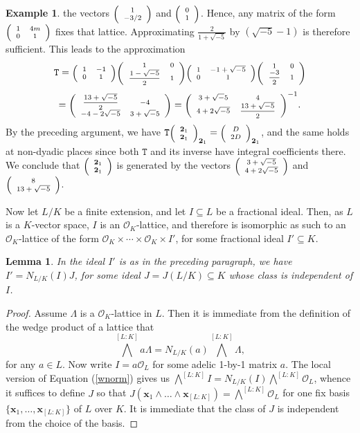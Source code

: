 \documentclass{article}
\newtheorem{Lem}[Prop]{Lemma}
\theoremstyle{definition}
\newtheorem{ex}[Prop]{Example}
\theoremstyle{remark}
\newcommand\sbmattrix[4]{\textnormal{\scriptsize$\left(\begin{array}{cc}#1&#2\\#3&#4\end{array}\right)$\normalsize}}
\newcommand\sbvecttor[2]{\textnormal{\scriptsize$\left(\begin{array}{cc}#1\\#2\end{array}\right)$\normalsize}}
\begin{document}
\begin{ex}
    the vectors $\sbvecttor{1}{-3/2}$ and $\sbvecttor01$. 
    Hence, any matrix of the form
    $\sbmattrix1{4m}01$ fixes that lattice. Approximating
    $\frac2{1+\sqrt{-5}}$ by $(\sqrt{-5}-1)$ is therefore sufficient.
    This leads to the approximation
    $$\mathtt{T}=
    \sbmattrix1{-1}01\sbmattrix10{\frac{1-\sqrt{-5}}2}1
    \sbmattrix1{-1+\sqrt{-5}}01
    \sbmattrix10{\frac{-3}2}1$$
    $$=\sbmattrix{\frac{13+\sqrt{-5}}2}{-4}{-4-2\sqrt{-5}}{3+\sqrt-5}
    ={\sbmattrix{3+\sqrt-5}{4}{4+2\sqrt{-5}}{\frac{13+\sqrt{-5}}2}}^{-1}.$$
    By the preceding argument, we have 
    $\mathtt{T}{\sbvecttor{\mathbf{2}_1}{\mathbf{2}_1}}_{\mathbf{2}_1}=
    {\sbvecttor{D}{2D}}_{\mathbf{2}_1}$, and the same holds at 
    non-dyadic places since both $\mathtt{T}$ and its inverse have integral coefficients there.
    We conclude that $\sbvecttor{\mathbf{2}_1}{\mathbf{2}_1}$ is 
    generated by the vectors $\sbvecttor{3+\sqrt{-5}}{4+2\sqrt{-5}}$ 
    and $\sbvecttor{8}{13+\sqrt{-5}}$.
\end{ex}

Now let $L/K$ be a finite extension, and let $I\subseteq L$ be
a fractional ideal. Then, as $L$ is a $K$-vector space, $I$ is
an $\mathcal{O}_K$-lattice, and therefore is isomorphic as such
to an $\mathcal{O}_K$-lattice of the form
$\mathcal{O}_K\times\cdots\times\mathcal{O}_K\times I'$,
for some fractional ideal $I'\subseteq K$.

\begin{Lem}\label{lp1}
    In the ideal $I'$ is as in the preceding paragraph, we have
    $I'=N_{L/K}(I)J$, for some ideal $J=J(L/K)\subseteq K$
    whose class is independent of $I$.
\end{Lem}

\begin{proof}
  Assume $\Lambda$ is a $\mathcal{O}_K$-lattice in $L$.
  Then it is immediate from the definition of the wedge 
  product of a lattice that
\begin{equation}\label{wnorm}
  \bigwedge^{[L:K]}\! a\Lambda=N_{L/K}(a)\bigwedge^{[L:K]}\! \Lambda, 
\end{equation}
  for any $a\in L$. Now write $I=a\mathcal{O}_L$ for some
  adelic 1-by-1 matrix $a$. The local version of
  Equation (\ref{wnorm}) gives us 
  $\bigwedge^{[L:K]}\! I=N_{L/K}(I)\bigwedge^{[L:K]}\! \mathcal{O}_L$,
  whence it suffices to define $J$ so that
  $J(\mathbf{x}_1\wedge\dots\wedge \mathbf{x}_{[L:K]})
  =\bigwedge^{[L:K]}\! \mathcal{O}_L$
  for one fix basis $\{\mathbf{x}_1,\dots,\mathbf{x}_{[L:K]}\}$ of $L$ 
  over $K$. It is immediate that the class of $J$ 
  is independent from the choice of the basis.
\end{proof}
\end{document}
